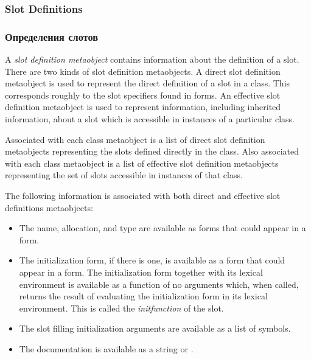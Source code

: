 \subsubsection{Slot Definitions}

\subsubsection{Определения слотов}

A \emph{slot definition metaobject} contains information about the definition of a
slot. There are two kinds of slot definition metaobjects. A direct slot
definition metaobject is used to represent the direct definition of a slot in a
class. This corresponds roughly to the slot specifiers found in 
forms. An effective slot definition metaobject is used to represent information,
including inherited information, about a slot which is accessible in instances
of a particular class. 

Associated with each class metaobject is a list of direct slot definition
metaobjects representing the slots defined directly in the class. Also
associated with each class metaobject is a list of effective slot definition
metaobjects representing the set of slots accessible in instances of that
class. 

The following information is associated with both direct and effective slot
definitions metaobjects: 

  \begin{itemize}
  \item 
    The name, allocation, and type are available as forms that could appear in a
     form.

  \item 
    The initialization form, if there is one, is available as a form that could
    appear in a  form. The initialization form together with its lexical
    environment is available as a function of no arguments which, when called,
    returns the result of evaluating the initialization form in its lexical
    environment. This is called the \emph{initfunction} of the slot.

  \item 
    The slot filling initialization arguments are available as a list of
    symbols. 

  \item 
    The documentation is available as a string or .

  \end{itemize}


